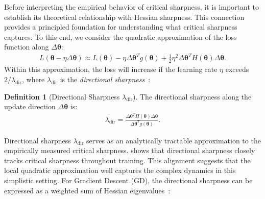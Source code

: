 \documentclass[]{fairmeta}
\theoremstyle{plain}
\theoremstyle{definition}
\newtheorem{definition}{Definition}[section]
\begin{document}
Before interpreting the empirical behavior of critical sharpness, it is important to establish its theoretical relationship with Hessian sharpness. This connection provides a principled foundation for understanding what critical sharpness captures.
To this end, we consider the quadratic approximation of the loss function along $\Delta \bm{\theta}$:
\begin{align}
    L(\bm{\theta} - \eta \Delta \bm{\theta}) \approx L(\bm{\theta}) - \eta \Delta \bm{\theta}^T g(\bm{\theta}) + \frac{1}{2} \eta^2 \Delta \bm{\theta}^T H(\bm{\theta}) \Delta \bm{\theta}. \nonumber
\end{align}
Within this approximation, the loss will increase if the learning rate $\eta$ exceeds $2 / \lambda_{\text{dir}}$, where $\lambda_{\text{dir}}$ is the \emph{directional sharpness}~\citep{pan2022toward,roulet2024stepping}:
\begin{definition}[Directional Sharpness $\lambda_{\text{dir}}$]
The directional sharpness along the update direction $\Delta \bm{\theta}$ is:
\begin{align}
    \lambda_{\text{dir}} = \frac{\Delta \bm{\theta}^T H(\bm{\theta}) \Delta \bm{\theta} }{\Delta \bm{\theta}^T g(\bm{\theta})}.
\end{align}
\end{definition}

Directional sharpness $\lambda_{\text{dir}}$ serves as an analytically tractable approximation to the empirically measured critical sharpness.  shows that directional sharpness closely tracks critical sharpness throughout training. 
This alignment suggests that the local quadratic approximation well captures the complex dynamics in this simplistic setting.
For Gradient Descent (GD), the directional sharpness can be expressed as a weighted sum of Hessian eigenvalues~\citep{roulet2024stepping}:



\end{document}
